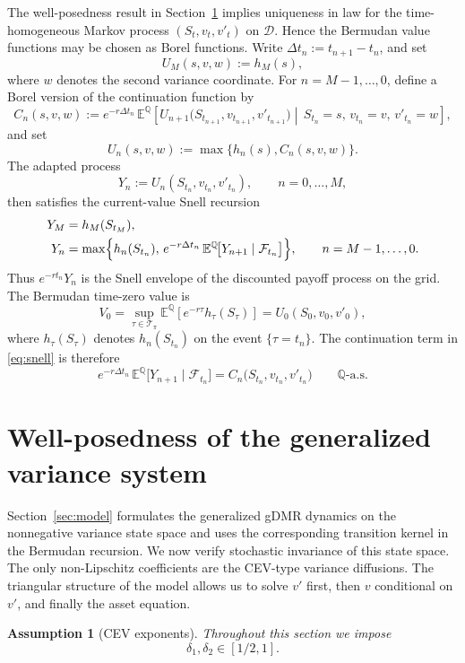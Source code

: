 \documentclass[pdflatex,sn-mathphys-num]{sn-jnl}
\theoremstyle{thmstyleone}%
\theoremstyle{thmstylethree}%
\newtheorem{assumption}[theorem]{Assumption}
\theoremstyle{thmstyletwo}%
\newcommand{\E}{\mathbb E}
\newcommand{\Q}{\mathbb Q}
\newcommand{\F}{\mathcal F}
\begin{document}
The well-posedness result in Section~\ref{sec:wellposed} implies uniqueness in
law for the time-homogeneous Markov process $(S_t,v_t,v'_t)$ on $\mathcal D$.
Hence the Bermudan value functions may be chosen as Borel functions. Write
\(\Delta t_n:=t_{n+1}-t_n\), and set
\[
    U_M(s,v,w):=h_M(s),
\]
where \(w\) denotes the second variance coordinate. For \(n=M-1,\ldots,0\),
define a Borel version of the continuation function by
\[
C_n(s,v,w)
:=e^{-r\Delta t_n}\,\E^\Q\!\left[
U_{n+1}\bigl(S_{t_{n+1}},v_{t_{n+1}},v'_{t_{n+1}}\bigr)
\middle|\,
S_{t_n}=s,\,v_{t_n}=v,\,v'_{t_n}=w
\right],
\]
and set
\[
U_n(s,v,w):=\max\{h_n(s),C_n(s,v,w)\}.
\]
The adapted process
\[
Y_n:=U_n(S_{t_n},v_{t_n},v'_{t_n}),\qquad n=0,\dots,M,
\]
then satisfies the current-value Snell recursion
\begin{equation}\label{eq:snell}
\begin{aligned}
Y_M&=h_M(S_{t_M}),\\
Y_n&=\max\Bigl\{h_n(S_{t_n}),\,
e^{-r\Delta t_n}\,
\E^\Q\!\bigl[Y_{n+1}\mid\F_{t_n}\bigr]\Bigr\},
\qquad n=M-1,\dots,0.
\end{aligned}
\end{equation}
Thus $e^{-rt_n}Y_n$ is the Snell envelope of the discounted payoff process on
the grid. The Bermudan time-zero value is
\[
V_0
=\sup_{\tau\in\mathcal T_\pi}\E^\Q\!\left[e^{-r\tau}h_\tau(S_\tau)\right]
=U_0(S_0,v_0,v'_0),
\]
where $h_\tau(S_\tau)$ denotes $h_n(S_{t_n})$ on the event $\{\tau=t_n\}$. The continuation term in \eqref{eq:snell} is therefore
\[
e^{-r\Delta t_n}\,\E^\Q\!\bigl[Y_{n+1}\mid\F_{t_n}\bigr]
=C_n\bigl(S_{t_n},v_{t_n},v'_{t_n}\bigr)\qquad\text{$\Q$-a.s.}
\]




\section{Well-posedness of the generalized variance system}\label{sec:wellposed}

Section~\ref{sec:model} formulates the generalized gDMR dynamics on the nonnegative
variance state space and uses the corresponding transition kernel in the
Bermudan recursion. We now verify stochastic invariance of this state space. The only
non-Lipschitz coefficients are the CEV-type variance diffusions. The triangular
structure of the model allows us to solve $v'$ first, then $v$ conditional on
$v'$, and finally the asset equation.

\begin{assumption}[CEV exponents]\label{ass:delta-range}
Throughout this section we impose
\[
\delta_1,\delta_2\in[1/2,1].
\]
\end{assumption}
\end{document}
